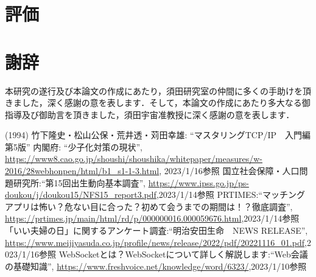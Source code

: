 \documentclass[12pt,a4j,titlepage]{ltjsarticle}
\begin{document}
\section{評価}
\subsection{}



\clearpage



\section{謝辞}
本研究の遂行及び本論文の作成にあたり，須田研究室の仲間に多くの手助けを頂きました，深く感謝の意を表します．そして，本論文の作成にあたり多大なる御指導及び御助言を頂きました，須田宇宙准教授に深く感謝の意を表します．

\clearpage

\begin{thebibliography}{99}
 (1994) 竹下隆史・松山公保・荒井透・苅田幸雄: ``マスタリングTCP/IP　入門編第5版''
 内閣府: ``少子化対策の現状'', \url{https://www8.cao.go.jp/shoushi/shoushika/whitepaper/measures/w-2016/28webhonpen/html/b1_s1-1-3.html}, 2023/1/16参照
国立社会保障・人口問題研究所:``第15回出生動向基本調査'',
\url{https://www.ipss.go.jp/ps-doukou/j/doukou15/NFS15_report3.pdf},2023/1/14参照
PRTIMES:``マッチングアプリは怖い？危ない目に合った？初めて会うまでの期間は！？徹底調査'',
\url{https://prtimes.jp/main/html/rd/p/000000016.000059676.html},2023/1/14参照
「いい夫婦の日」に関するアンケート調査:``明治安田生命　NEWS RELEASE'',
\url{https://www.meijiyasuda.co.jp/profile/news/release/2022/pdf/20221116_01.pdf},2023/1/16参照
WebSocketとは？WebSocketについて詳しく解説します:``Web会議の基礎知識'',
\url{https://www.freshvoice.net/knowledge/word/6323/},2023/1/10参照
\end{thebibliography}
\end{document}

